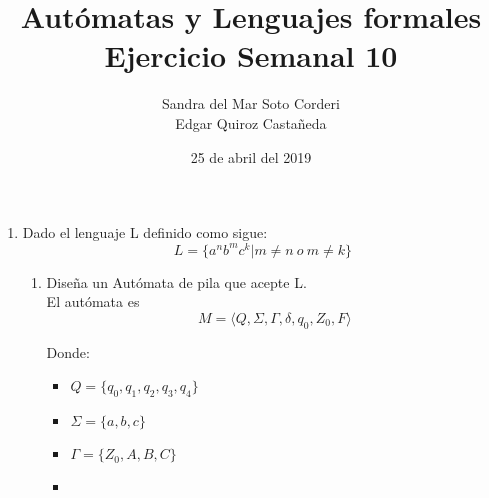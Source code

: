 \documentclass{article}
\begin{document}
    \title{
        Autómatas y Lenguajes formales \\
        Ejercicio Semanal 10
    }

    \author{
        Sandra del Mar Soto Corderi \\
        Edgar Quiroz Castañeda
    }

    \date{
        25 de abril del 2019
    }
    
    \maketitle

    \begin{enumerate}
        \item {
        Dado el lenguaje L definido como sigue:\\
        \begin{equation*}
        	L = \{a^nb^mc^k | m \neq n \ o \   m \neq k \}
        \end{equation*}
        
        
        \begin{enumerate}
        	\item {
        	Diseña un Autómata de pila que acepte L.\\
         El autómata es \[M = \langle Q , \Sigma, \Gamma , \delta, q_0 , Z_0,  F\rangle\]
         
         Donde:
         
         \begin{itemize}
         	\item {
         		$Q = \{q_0, q_1, q_2, q_3, q_4\}$
         	}
         	\item {
         		$\Sigma = \{a, b,c\}$
         	}
         	\item {
         		$\Gamma = \{Z_0, A, B, C\}$
         	}
         	
         	
         	\item {
         	        		
}
\end{itemize}}
\end{enumerate}}
\end{enumerate}
\end{document}
